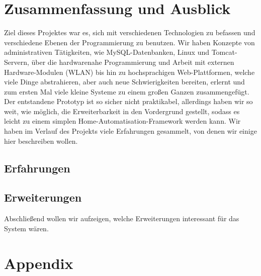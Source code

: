 \documentclass[12pt,a4paper,twoside]{article}
\newcommand{\labelSec}[1]{\label{sec:#1}}
\begin{document}
\section{Zusammenfassung und Ausblick} \labelSec{ausblick}
Ziel dieses Projektes war es, sich mit verschiedenen Technologien zu befassen und verschiedene Ebenen der Programmierung zu benutzen. Wir haben Konzepte von administrativen Tätigkeiten, wie MySQL-Datenbanken, Linux und Tomcat-Servern, über die hardwarenahe Programmierung und Arbeit mit externen Hardware-Modulen (WLAN) bis hin zu hochsprachigen Web-Plattformen, welche viele Dinge abstrahieren, aber auch neue Schwierigkeiten bereiten, erlernt und zum ersten Mal viele kleine Systeme zu einem großen Ganzen zusammengefügt. Der entstandene Prototyp ist so sicher nicht praktikabel, allerdings haben wir so weit, wie möglich, die Erweiterbarkeit in den Vordergrund gestellt, sodass es leicht zu einem simplen Home-Automatisation-Framework werden kann. Wir haben im Verlauf des Projekts viele Erfahrungen gesammelt, von denen wir einige hier beschreiben wollen.
\subsection{Erfahrungen}
\subsection{Erweiterungen}
Abschließend wollen wir aufzeigen, welche Erweiterungen interessant für das System wären. 

\clearpage

\section{Appendix}




\end{document}
